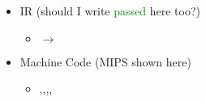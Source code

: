 {\begin{itemize}
\item IR (should I write \textcolor{green}{passed} here too?)

\begin{itemize}

\item {} $\rightarrow$ 

\end{itemize}

\item Machine Code (MIPS shown here)

\begin{itemize}

\item
{},,,,

\end{itemize}

\end{itemize}

}